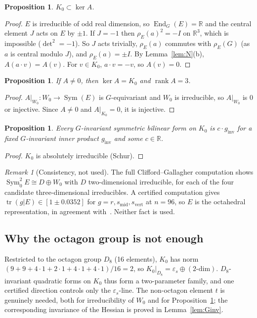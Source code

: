 \documentclass[11pt]{amsart}
\newtheorem{proposition}[theorem]{Proposition}
\theoremstyle{definition}
\theoremstyle{remark}
\newtheorem{remark}[theorem]{Remark}
\newcommand{\R}{\mathbb{R}}
\newcommand{\Sym}{\operatorname{Sym}}
\newcommand{\tr}{\operatorname{tr}}
\newcommand{\rank}{\operatorname{rank}}
\newcommand{\gin}{g_{\mathrm{inv}}}
\newcommand{\smid}{s_{\mathrm{mid}}}
\newcommand{\svert}{s_{\mathrm{vert}}}
\begin{document}
\begin{proposition}\label{prop:K0kerA}
$K_0\subset\ker A$.
\end{proposition}

\begin{proof}
$E$ is irreducible of odd real dimension, so $\operatorname{End}_G(E)=\R$ and the central element $J$
acts on $E$ by $\pm1$. If $J=-1$ then $\rho_E(a)^2=-I$ on $\R^3$, which is impossible
($\det^2=-1$). So $J$ acts trivially, $\rho_E(a)$ commutes with $\rho_E(G)$ (as $a$ is central
modulo $J$), and $\rho_E(a)=\pm I$. By Lemma~\ref{lem:N}(b), $A(a\cdot v)=A(v)$. For $v\in K_0$,
$a\cdot v=-v$, so $A(v)=0$.
\end{proof}

\begin{proposition}\label{prop:kerA}
If $A\ne0$, then $\ker A=K_0$ and $\rank A=3$.
\end{proposition}

\begin{proof}
$A|_{W_0}\colon W_0\to\Sym(E)$ is $G$-equivariant and $W_0$ is irreducible, so $A|_{W_0}$ is $0$ or
injective. Since $A\ne0$ and $A|_{K_0}=0$, it is injective.
\end{proof}

\begin{proposition}\label{prop:scalar}
Every $G$-invariant symmetric bilinear form on $K_0$ is $c\cdot\gin$ for a fixed $G$-invariant
inner product $\gin$ and some $c\in\R$.
\end{proposition}

\begin{proof}
$K_0$ is absolutely irreducible (Schur).
\end{proof}

\begin{remark}[Consistency, not used]
The full Clifford--Gallagher computation shows $\Sym_0^2E\cong D\oplus W_0$ with $D$
two-dimensional irreducible, for each of the four candidate three-dimensional irreducibles. A
certified computation gives $\tr(g|E)\in[1\pm0.0352]$ for $g=r,\smid,\svert$ at $n=96$, so $E$ is
the octahedral representation, in agreement with~\cite[Thm.~3.9]{Coo18}. Neither fact is used.
\end{remark}

\subsection{Why the octagon group is not enough}\label{subsec:D8}
Restricted to the octagon group $D_8$ (16 elements), $K_0$ has norm
$(9+9+4\cdot1+2\cdot1+4\cdot1+4\cdot1)/16=2$, so $K_0|_{D_8}=\varepsilon_s\oplus(\text{2-dim})$.
$D_8$-invariant quadratic forms on $K_0$ thus form a two-parameter family, and one certified
direction controls only the $\varepsilon_s$-line. The non-octagon element $t$ is genuinely needed,
both for irreducibility of $W_0$ and for Proposition~\ref{prop:scalar}; the corresponding
invariance of the Hessian is proved in Lemma~\ref{lem:Ginv}.
\end{document}
